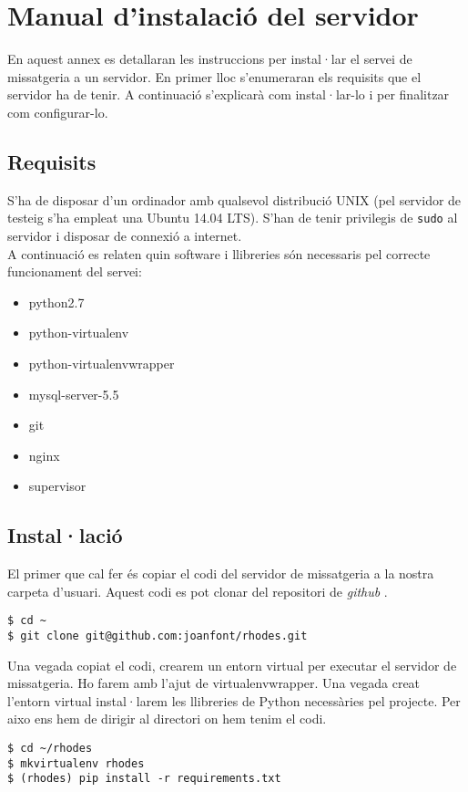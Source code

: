 \chapter{Manual d'instalació del servidor}\label{instalacio}
En aquest annex es detallaran les instruccions per instal·lar el servei de missatgeria a un servidor. En primer lloc s'enumeraran els requisits que el servidor ha de tenir. A continuació s'explicarà com instal·lar-lo i per finalitzar com configurar-lo.

\section{Requisits}

S'ha de disposar d'un ordinador amb qualsevol distribució UNIX (pel servidor de testeig s'ha empleat una Ubuntu 14.04 LTS). S'han de tenir privilegis de \texttt{sudo} al servidor i disposar de connexió a internet.\\

A continuació es relaten quin software i llibreries són necessaris pel correcte funcionament del servei:
\begin{itemize}
	\item python2.7
	\item python-virtualenv
	\item python-virtualenvwrapper
	\item mysql-server-5.5
	\item git
	\item nginx
	\item supervisor
\end{itemize}
\section{Instal·lació}
El primer que cal fer és copiar el codi del servidor de missatgeria a la nostra carpeta d'usuari. Aquest codi es pot clonar del repositori de \emph{github} \cite{repo}.
\begin{verbatim}
$ cd ~
$ git clone git@github.com:joanfont/rhodes.git
\end{verbatim}

Una vegada copiat el codi, crearem un entorn virtual per executar el servidor de missatgeria. Ho farem amb l'ajut de virtualenvwrapper. Una vegada creat l'entorn virtual instal·larem les llibreries de Python necessàries pel projecte. Per aixo ens hem de dirigir al directori on hem tenim el codi.

\begin{verbatim}
$ cd ~/rhodes
$ mkvirtualenv rhodes
$ (rhodes) pip install -r requirements.txt
\end{verbatim}

